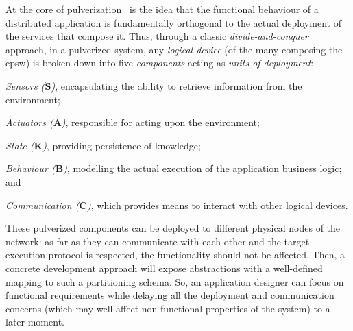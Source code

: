 \def\nm{0.35cm} %
\def\tpscale{0.8}
\newcommand{\agent}{node}
\renewcommand{\boldsymbol}[1]{\mathbf{#1}}
\newcommand{\LSens}{\boldsymbol{S}}
\newcommand{\LComp}{\boldsymbol{B}}
\newcommand{\LComm}{\boldsymbol{C}}
\newcommand{\LAct}{\boldsymbol{A}}
\newcommand{\LState}{\boldsymbol{K}}
At the core of pulverization~\cite{DBLP:journals/fi/CasadeiPPVW20} is the idea that the functional behaviour of a distributed application is fundamentally orthogonal to the actual deployment of the services that compose it.
%
Thus, through a classic \emph{divide-and-conquer} approach, in a pulverized system, 
 any \emph{logical device} (of the many composing the \ac{cpsw}) 
 is broken down into five \emph{components} acting as \emph{units of deployment}:
\begin{enumerate*}
 \item \emph{Sensors ($\LSens$)}, encapsulating the ability to retrieve information from the environment;
 \item \emph{Actuators ($\LAct$)}, responsible for acting upon the environment;
 \item \emph{State ($\LState$)}, providing persistence of knowledge;
 \item \emph{Behaviour ($\LComp$)}, modelling the actual execution of the application business logic; and
 \item \emph{Communication ($\LComm$)}, which provides means to interact with other logical devices.
\end{enumerate*}
%
These pulverized components can be deployed to different physical nodes of the network:
 as far as they can communicate with each other
 and the target execution protocol is respected,
 the functionality should not be affected.
%
Then, 
 a concrete development approach
 will expose abstractions
 with a well-defined mapping
 to such a partitioning schema.
%
So, an application designer can focus on functional requirements 
 while delaying all the deployment and communication concerns 
 (which may well affect non-functional properties of the system) 
 to a later moment. 

